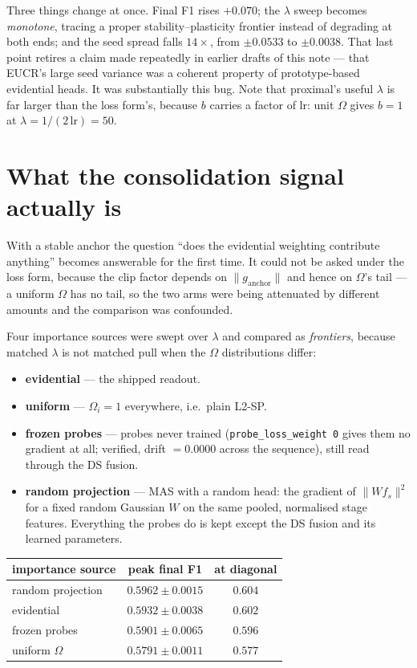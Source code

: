 \documentclass{article}
\begin{document}
Three things change at once. Final F1 rises $+0.070$; the $\lambda$ sweep becomes
\emph{monotone}, tracing a proper stability--plasticity frontier instead of
degrading at both ends; and the seed spread falls $14\times$, from $\pm0.0533$ to
$\pm0.0038$. That last point retires a claim made repeatedly in earlier drafts of
this note --- that EUCR's large seed variance was a coherent property of
prototype-based evidential heads. It was substantially this bug. Note that
proximal's useful $\lambda$ is far larger than the loss form's, because $b$
carries a factor of $\mathrm{lr}$: unit $\Omega$ gives $b=1$ at
$\lambda = 1/(2\,\mathrm{lr}) = 50$.

\section{What the consolidation signal actually is}
\label{sec:frontier}

With a stable anchor the question ``does the evidential weighting contribute
anything'' becomes answerable for the first time. It could not be asked under the
loss form, because the clip factor depends on $\lVert g_{\text{anchor}}\rVert$
and hence on $\Omega$'s tail --- a uniform $\Omega$ has no tail, so the two arms
were being attenuated by different amounts and the comparison was confounded.

Four importance sources were swept over $\lambda$ and compared as
\emph{frontiers}, because matched $\lambda$ is not matched pull when the $\Omega$
distributions differ:

\begin{itemize}
  \item \textbf{evidential} --- the shipped readout.
  \item \textbf{uniform} --- $\Omega_i = 1$ everywhere, i.e.\ plain L2-SP.
  \item \textbf{frozen probes} --- probes never trained (\texttt{probe\_loss\_weight 0}
        gives them no gradient at all; verified, drift $=0.0000$ across the
        sequence), still read through the DS fusion.
  \item \textbf{random projection} --- MAS with a random head: the gradient of
        $\lVert Wf_s\rVert^2$ for a fixed random Gaussian $W$ on the same pooled,
        normalised stage features. Everything the probes do is kept except the DS
        fusion and its learned parameters.
\end{itemize}

\begin{center}
\begin{tabular}{lcc}
\toprule
importance source & peak final F1 & at diagonal \\
\midrule
random projection & $\mathbf{0.5962 \pm 0.0015}$ & $0.604$ \\
evidential        & $0.5932 \pm 0.0038$ & $0.602$ \\
frozen probes     & $0.5901 \pm 0.0065$ & $0.596$ \\
uniform $\Omega$  & $0.5791 \pm 0.0011$ & $0.577$ \\
\bottomrule
\end{tabular}
\end{center}
\end{document}
